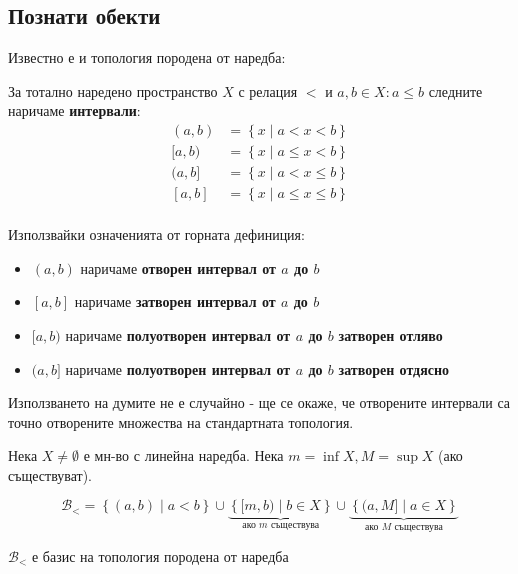 \subsection{Познати обекти}
Известно е и топология породена от наредба:
\begin{definition}
    За тотално наредено пространство $X$ с релация $<$ и $a, b \in X: a \leq b$ следните наричаме \textbf{интервали}:
    \begin{equation*}
        \begin{split}
            (a, b) & = \left\{x\mid a < x < b\right\} \\
            [a, b) & = \left\{x\mid a \leq x < b\right\} \\
            (a, b] & = \left\{x\mid a < x \leq b\right\} \\
            [a, b] & = \left\{x\mid a \leq x \leq b\right\} \\
        \end{split}
    \end{equation*}
\end{definition}
\begin{notation}
    Използвайки означенията от горната дефиниция:
    \begin{itemize}
        \item $(a, b)$ наричаме \textbf{отворен интервал от $a$ до $b$}
        \item $[a, b]$ наричаме \textbf{затворен интервал от $a$ до $b$}
        \item $[a, b)$ наричаме \textbf{полуотворен интервал от $a$ до $b$} \textbf{затворен отляво}
        \item $(a, b]$ наричаме \textbf{полуотворен интервал от $a$ до $b$} \textbf{затворен отдясно}
    \end{itemize}
\end{notation}
Използването на думите не е случайно - ще се окаже, че отворените интервали са точно отворените множества на стандартната топология.
\begin{definition}
    Нека $X \neq \emptyset$ е мн-во с линейна наредба. Нека $m=\inf X, M=\sup X$ (ако съществуват). 

    \begin{equation*}
        \mathcal B_< = \left\{(a,b) \mid a < b\right\} \cup \underbrace{\left\{ [m, b) \mid b \in X \right\}}_{\text{ако $m$ съществува}} \cup \underbrace{\left\{ (a, M] \mid a \in X \right\}}_{\text{ако $M$ съществува}}
    \end{equation*}
\end{definition}
\begin{notation}
    $\mathcal B_<$ е базис на топология породена от наредба
\end{notation}


